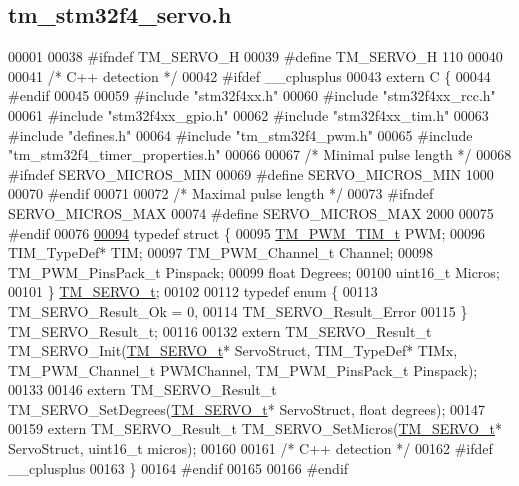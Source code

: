 \hypertarget{tm__stm32f4__servo_8h_source}{}\subsection{tm\+\_\+stm32f4\+\_\+servo.\+h}

\begin{DoxyCode}
00001 
00038 \textcolor{preprocessor}{#ifndef TM\_SERVO\_H}
00039 \textcolor{preprocessor}{#define TM\_SERVO\_H 110}
00040 
00041 \textcolor{comment}{/* C++ detection */}
00042 \textcolor{preprocessor}{#ifdef \_\_cplusplus}
00043 \textcolor{keyword}{extern} C \{
00044 \textcolor{preprocessor}{#endif}
00045     
00059 \textcolor{preprocessor}{#include "stm32f4xx.h"}
00060 \textcolor{preprocessor}{#include "stm32f4xx\_rcc.h"}
00061 \textcolor{preprocessor}{#include "stm32f4xx\_gpio.h"}
00062 \textcolor{preprocessor}{#include "stm32f4xx\_tim.h"}
00063 \textcolor{preprocessor}{#include "defines.h"}
00064 \textcolor{preprocessor}{#include "tm\_stm32f4\_pwm.h"}
00065 \textcolor{preprocessor}{#include "tm\_stm32f4\_timer\_properties.h"}
00066 
00067 \textcolor{comment}{/* Minimal pulse length */}
00068 \textcolor{preprocessor}{#ifndef SERVO\_MICROS\_MIN}
00069 \textcolor{preprocessor}{#define SERVO\_MICROS\_MIN    1000}
00070 \textcolor{preprocessor}{#endif}
00071 
00072 \textcolor{comment}{/* Maximal pulse length */}
00073 \textcolor{preprocessor}{#ifndef SERVO\_MICROS\_MAX}
00074 \textcolor{preprocessor}{#define SERVO\_MICROS\_MAX    2000}
00075 \textcolor{preprocessor}{#endif}
00076     
\hypertarget{tm__stm32f4__servo_8h_source_l00094}{}\hyperlink{struct_t_m___s_e_r_v_o__t}{00094} \textcolor{keyword}{typedef} \textcolor{keyword}{struct }\{
00095     \hyperlink{struct_t_m___p_w_m___t_i_m__t}{TM\_PWM\_TIM\_t} PWM;
00096     TIM\_TypeDef* TIM;
00097     TM\_PWM\_Channel\_t Channel;
00098     TM\_PWM\_PinsPack\_t Pinspack;
00099     \textcolor{keywordtype}{float} Degrees;
00100     uint16\_t Micros;
00101 \} \hyperlink{struct_t_m___s_e_r_v_o__t}{TM\_SERVO\_t};
00102 
00112 \textcolor{keyword}{typedef} \textcolor{keyword}{enum} \{
00113     TM\_SERVO\_Result\_Ok = 0,
00114     TM\_SERVO\_Result\_Error
00115 \} TM\_SERVO\_Result\_t;
00116 
00132 \textcolor{keyword}{extern} TM\_SERVO\_Result\_t TM\_SERVO\_Init(\hyperlink{struct_t_m___s_e_r_v_o__t}{TM\_SERVO\_t}* ServoStruct, TIM\_TypeDef* TIMx, 
      TM\_PWM\_Channel\_t PWMChannel, TM\_PWM\_PinsPack\_t Pinspack);
00133 
00146 \textcolor{keyword}{extern} TM\_SERVO\_Result\_t TM\_SERVO\_SetDegrees(\hyperlink{struct_t_m___s_e_r_v_o__t}{TM\_SERVO\_t}* ServoStruct, \textcolor{keywordtype}{float} degrees);
00147 
00159 \textcolor{keyword}{extern} TM\_SERVO\_Result\_t TM\_SERVO\_SetMicros(\hyperlink{struct_t_m___s_e_r_v_o__t}{TM\_SERVO\_t}* ServoStruct, uint16\_t micros);
00160 
00161 \textcolor{comment}{/* C++ detection */}
00162 \textcolor{preprocessor}{#ifdef \_\_cplusplus}
00163 \}
00164 \textcolor{preprocessor}{#endif}
00165 
00166 \textcolor{preprocessor}{#endif}
\end{DoxyCode}
